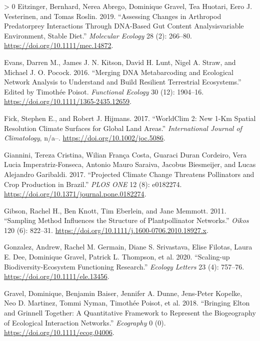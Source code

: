 \documentclass[10pt,oneside]{article}
\newlength{\cslhangindent}
\newenvironment{CSLReferences}[3] %
 {%
  \setlength{\parindent}{0pt}
  \ifodd #1 \everypar{\setlength{\hangindent}{\cslhangindent}}\ignorespaces\fi
  \ifnum #2 > 0
  \setlength{\parskip}{#2\baselineskip}
  \fi
 }%
 {}
\begin{document}
\begin{CSLReferences}{1}{0}
\leavevmode\hypertarget{ref-Eitzinger2019AssCha}{}%
Eitzinger, Bernhard, Nerea Abrego, Dominique Gravel, Tea Huotari, Eero
J. Vesterinen, and Tomas Roslin. 2019. {``Assessing Changes in Arthropod
Predatorprey Interactions Through DNA-Based Gut Content Analysisvariable
Environment, Stable Diet.''} \emph{Molecular Ecology} 28 (2): 266--80.
\url{https://doi.org/10.1111/mec.14872}.

\leavevmode\hypertarget{ref-Evans2016MerDna}{}%
Evans, Darren M., James J. N. Kitson, David H. Lunt, Nigel A. Straw, and
Michael J. O. Pocock. 2016. {``Merging DNA Metabarcoding and Ecological
Network Analysis to Understand and Build Resilient Terrestrial
Ecosystems.''} Edited by Timothée Poisot. \emph{Functional Ecology} 30
(12): 1904--16. \url{https://doi.org/10.1111/1365-2435.12659}.

\leavevmode\hypertarget{ref-Fick2017Wor2N}{}%
Fick, Stephen E., and Robert J. Hijmans. 2017. {``WorldClim 2: New 1-Km
Spatial Resolution Climate Surfaces for Global Land Areas.''}
\emph{International Journal of Climatology}, n/a--.
\url{https://doi.org/10.1002/joc.5086}.

\leavevmode\hypertarget{ref-Giannini2017ProCli}{}%
Giannini, Tereza Cristina, Wilian França Costa, Guaraci Duran Cordeiro,
Vera Lucia Imperatriz-Fonseca, Antonio Mauro Saraiva, Jacobus
Biesmeijer, and Lucas Alejandro Garibaldi. 2017. {``Projected Climate
Change Threatens Pollinators and Crop Production in Brazil.''}
\emph{PLOS ONE} 12 (8): e0182274.
\url{https://doi.org/10.1371/journal.pone.0182274}.

\leavevmode\hypertarget{ref-Gibson2011SamMet}{}%
Gibson, Rachel H., Ben Knott, Tim Eberlein, and Jane Memmott. 2011.
{``Sampling Method Influences the Structure of Plantpollinator
Networks.''} \emph{Oikos} 120 (6): 822--31.
\url{https://doi.org/10.1111/j.1600-0706.2010.18927.x}.

\leavevmode\hypertarget{ref-Gonzalez2020ScaBio}{}%
Gonzalez, Andrew, Rachel M. Germain, Diane S. Srivastava, Elise Filotas,
Laura E. Dee, Dominique Gravel, Patrick L. Thompson, et al. 2020.
{``Scaling-up Biodiversity-Ecosystem Functioning Research.''}
\emph{Ecology Letters} 23 (4): 757--76.
\url{https://doi.org/10.1111/ele.13456}.

\leavevmode\hypertarget{ref-Gravel2018BriElt}{}%
Gravel, Dominique, Benjamin Baiser, Jennifer A. Dunne, Jens-Peter
Kopelke, Neo D. Martinez, Tommi Nyman, Timothée Poisot, et al. 2018.
{``Bringing Elton and Grinnell Together: A Quantitative Framework to
Represent the Biogeography of Ecological Interaction Networks.''}
\emph{Ecography} 0 (0). \url{https://doi.org/10.1111/ecog.04006}.


\end{CSLReferences}
\end{document}
